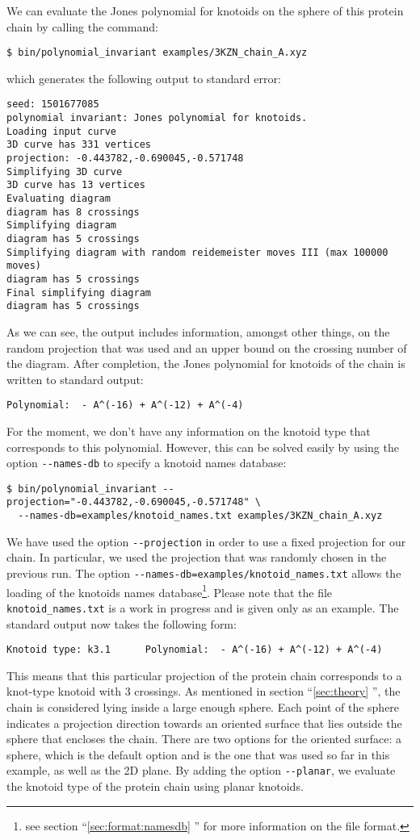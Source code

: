 We can evaluate the Jones polynomial for knotoids on the sphere of this protein chain by calling the command:
\begin{lstlisting}
$ bin/polynomial_invariant examples/3KZN_chain_A.xyz 
\end{lstlisting}
which generates the following output to standard error:
\begin{lstlisting}
seed: 1501677085
polynomial invariant: Jones polynomial for knotoids.
Loading input curve
3D curve has 331 vertices
projection: -0.443782,-0.690045,-0.571748
Simplifying 3D curve
3D curve has 13 vertices
Evaluating diagram
diagram has 8 crossings
Simplifying diagram
diagram has 5 crossings
Simplifying diagram with random reidemeister moves III (max 100000 moves)
diagram has 5 crossings
Final simplifying diagram
diagram has 5 crossings
\end{lstlisting}
As we can see, the output includes information, amongst other things, on the random projection that was used and an upper bound on the crossing number of the diagram. After completion, the Jones polynomial for knotoids of the chain is written to standard output:
\begin{lstlisting}
Polynomial:  - A^(-16) + A^(-12) + A^(-4)
\end{lstlisting}
For the moment, we don't have any information on the knotoid type that corresponds to this polynomial. However, this can be solved easily by using the option \lstinline{--names-db} to specify a knotoid names database:
\begin{lstlisting}
$ bin/polynomial_invariant --projection="-0.443782,-0.690045,-0.571748" \
  --names-db=examples/knotoid_names.txt examples/3KZN_chain_A.xyz
\end{lstlisting}
We have used the option \lstinline{--projection} in order to use a fixed projection for our chain. In particular, we used the projection that was randomly chosen in the previous run. The option \lstinline{--names-db=examples/knotoid_names.txt} allows the loading of the knotoids names database\footnote{see section ``\ref{sec:format:namesdb} '' for more information on the file format.}. Please note that the file \lstinline{knotoid_names.txt} is a work in progress and is given only as an example. The standard output now takes the following form:
\begin{lstlisting}
Knotoid type: k3.1      Polynomial:  - A^(-16) + A^(-12) + A^(-4)
\end{lstlisting}
This means that this particular projection of the protein chain corresponds to a knot-type knotoid with 3 crossings. As mentioned in section ``\ref{sec:theory} '', the chain is considered lying inside a large enough sphere. Each point of the sphere indicates a projection direction towards an oriented surface that lies outside the sphere that encloses the chain. There are two options for the oriented surface: a sphere, which is the default option and is the one that was used so far in this example, as well as the 2D plane. By adding the option \lstinline{--planar}, we evaluate the knotoid type of the protein chain using planar knotoids.
